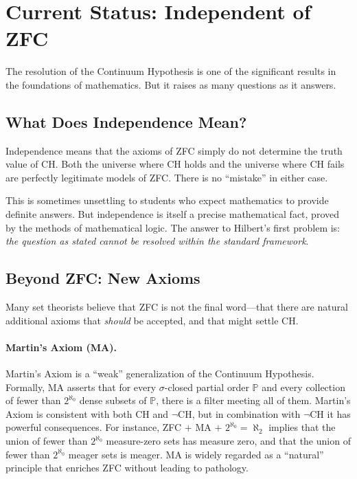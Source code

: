 \section{Current Status: Independent of ZFC}

The resolution of the Continuum Hypothesis is one of the significant results in the foundations of mathematics. But it raises as many questions as it answers.

\subsection{What Does Independence Mean?}

Independence means that the axioms of ZFC simply do not determine the truth value of CH. Both the universe where CH holds and the universe where CH fails are perfectly legitimate models of ZFC. There is no ``mistake'' in either case.

This is sometimes unsettling to students who expect mathematics to provide definite answers. But independence is itself a precise mathematical fact, proved by the methods of mathematical logic. The answer to Hilbert's first problem is: \emph{the question as stated cannot be resolved within the standard framework}.

\subsection{Beyond ZFC: New Axioms}

Many set theorists believe that ZFC is not the final word---that there are natural additional axioms that \emph{should} be accepted, and that might settle CH.

\paragraph{Martin's Axiom (MA).}
Martin's Axiom is a ``weak'' generalization of the Continuum Hypothesis. Formally, MA asserts that for every $\sigma$-closed partial order $\mathbb{P}$ and every collection of fewer than $2^{\aleph_0}$ dense subsets of $\mathbb{P}$, there is a filter meeting all of them. Martin's Axiom is consistent with both CH and $\neg$CH, but in combination with $\neg$CH it has powerful consequences. For instance, ZFC $+$ MA $+$ $2^{\aleph_0} = \aleph_2$ implies that the union of fewer than $2^{\aleph_0}$ measure-zero sets has measure zero, and that the union of fewer than $2^{\aleph_0}$ meager sets is meager. MA is widely regarded as a ``natural'' principle that enriches ZFC without leading to pathology.

